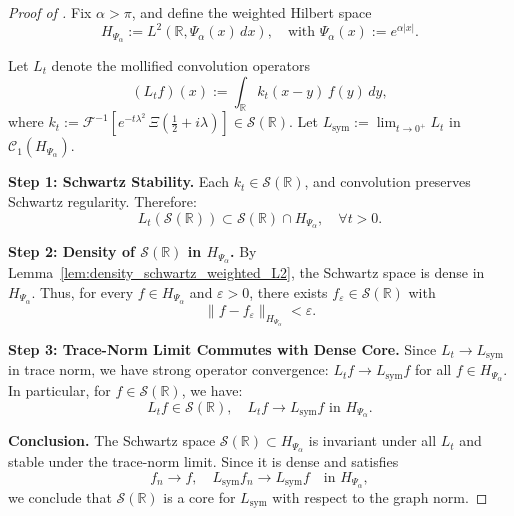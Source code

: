 \begin{proof}[Proof of ]
Fix \( \alpha > \pi \), and define the weighted Hilbert space
\[
H_{\Psi_\alpha} := L^2(\mathbb{R}, \Psi_\alpha(x)\, dx), \quad \text{with } \Psi_\alpha(x) := e^{\alpha |x|}.
\]

Let \( L_t \) denote the mollified convolution operators
\[
(L_t f)(x) := \int_{\mathbb{R}} k_t(x - y)\, f(y)\, dy,
\]
where \( k_t := \mathscr{F}^{-1}\left[ e^{-t\lambda^2} \, \Xi\left(\tfrac{1}{2} + i\lambda \right) \right] \in \mathcal{S}(\mathbb{R}) \). Let \( L_{\mathrm{sym}} := \lim_{t \to 0^+} L_t \) in \( \mathcal{C}_1(H_{\Psi_\alpha}) \).

\medskip
\noindent\textbf{Step 1: Schwartz Stability.}
Each \( k_t \in \mathcal{S}(\mathbb{R}) \), and convolution preserves Schwartz regularity. Therefore:
\[
L_t(\mathcal{S}(\mathbb{R})) \subset \mathcal{S}(\mathbb{R}) \cap H_{\Psi_\alpha}, \quad \forall t > 0.
\]

\medskip
\noindent\textbf{Step 2: Density of \( \mathcal{S}(\mathbb{R}) \) in \( H_{\Psi_\alpha} \).}
By Lemma~\ref{lem:density_schwartz_weighted_L2}, the Schwartz space is dense in \( H_{\Psi_\alpha} \). Thus, for every \( f \in H_{\Psi_\alpha} \) and \( \varepsilon > 0 \), there exists \( f_\varepsilon \in \mathcal{S}(\mathbb{R}) \) with
\[
\|f - f_\varepsilon\|_{H_{\Psi_\alpha}} < \varepsilon.
\]

\medskip
\noindent\textbf{Step 3: Trace-Norm Limit Commutes with Dense Core.}
Since \( L_t \to L_{\mathrm{sym}} \) in trace norm, we have strong operator convergence: \( L_t f \to L_{\mathrm{sym}} f \) for all \( f \in H_{\Psi_\alpha} \). In particular, for \( f \in \mathcal{S}(\mathbb{R}) \), we have:
\[
L_t f \in \mathcal{S}(\mathbb{R}), \quad L_t f \to L_{\mathrm{sym}} f \text{ in } H_{\Psi_\alpha}.
\]

\medskip
\noindent\textbf{Conclusion.}
The Schwartz space \( \mathcal{S}(\mathbb{R}) \subset H_{\Psi_\alpha} \) is invariant under all \( L_t \) and stable under the trace-norm limit. Since it is dense and satisfies
\[
f_n \to f, \quad L_{\mathrm{sym}} f_n \to L_{\mathrm{sym}} f \quad \text{in } H_{\Psi_\alpha},
\]
we conclude that \( \mathcal{S}(\mathbb{R}) \) is a core for \( L_{\mathrm{sym}} \) with respect to the graph norm.
\end{proof}
